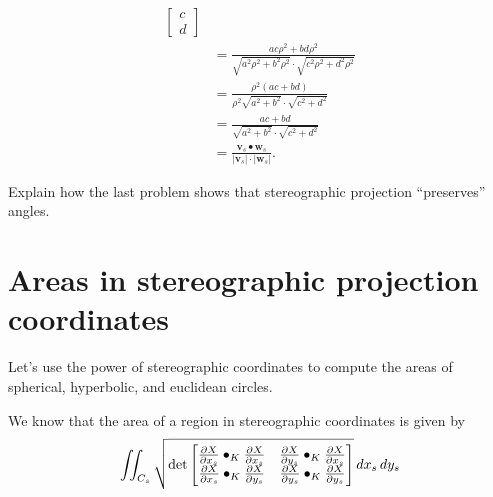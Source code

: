 \documentclass[newpage,hints,handout]{ximera}
\begin{document}
\begin{problem}
\begin{freeResponse}
\begin{align*}
{{\begin{bmatrix}
            c\\
            d
          \end{bmatrix}}
        }\\
        &= \frac{ac\rho^2 + bd\rho^2}{\sqrt{a^2\rho^2+b^2\rho^2}\cdot \sqrt{c^2\rho^2+d^2\rho^2}}\\
        &= \frac{\rho^2(ac + bd)}{\rho^2\sqrt{a^2+b^2}\cdot \sqrt{c^2+d^2}}\\
        &= \frac{ac + bd}{\sqrt{a^2+b^2}\cdot \sqrt{c^2+d^2}}\\
        &=\frac{\mathbf{v}_s\bullet \mathbf{w}_s}{|\mathbf{v}_s|\cdot|\mathbf{w}_s|}.
    \end{align*}
  \end{freeResponse}
\end{problem}


\begin{problem}
  Explain how the last problem shows that stereographic projection
  ``preserves'' angles. 
\end{problem}




















\section{Areas in stereographic projection coordinates}

Let's use the power of stereographic coordinates to compute the areas
of spherical, hyperbolic, and euclidean circles.

We know that the area of a region in stereographic coordinates is given by 
\[
\iint_{C_s} \sqrt{
  \det
  \begin{bmatrix}
    \pp[X]{x_s}\bullet_K \pp[X]{x_s} & \pp[X]{y_s}\bullet_K \pp[X]{x_s} \\
    \pp[X]{x_s}\bullet_K \pp[X]{y_s} & \pp[X]{y_s}\bullet_K \pp[X]{y_s}
  \end{bmatrix}
}\d x_s\d y_s
\]
\end{document}
